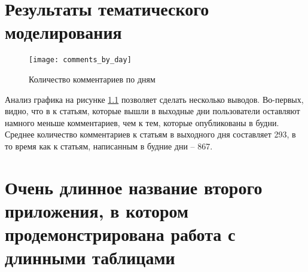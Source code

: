 \chapter{Результаты тематического моделирования} \label{app:comments_by_day}
\begin{figure}
	\centering
    \texttt{[image: comments\_by\_day]}
    \caption{Количество комментариев по дням}
    \label{fig:comments_by_day}
\end{figure}

Анализ графика на рисунке \ref{fig:comments_by_day} позволяет сделать несколько выводов. Во-первых, видно, что в к статьям, которые вышли в выходные дни пользователи оставляют намного меньше комментариев, чем к тем, которые опубликованы в будни. Среднее количество комментариев к статьям в выходного дня составляет 293, в то время как к статьям, написанным в будние дни -- 867.

\chapter{Очень длинное название второго приложения, в котором продемонстрирована работа с длинными таблицами} \label{AppendixB}

